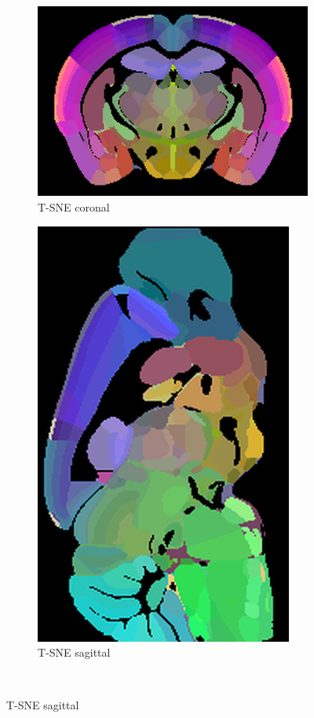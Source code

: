\documentclass[]{article}
\begin{document}
\begin{figure}
	\begin{subfigure}{.43\textwidth}
		\centering
		\includegraphics[width=.9\linewidth]{../results/tsne_ano_coronal_50_res_slice_1.png}
		\caption{T-SNE coronal}
		\label{fig:TSNE_cor}
	\end{subfigure}
	\begin{subfigure}{.3\textwidth}
		\centering
		\includegraphics[width=.9\linewidth, angle=270]{../results/tsne_ano_sagittal_50_res_slice_1.png}
		\caption{T-SNE sagittal}
		\label{fig:TSNE_sag}
	\end{subfigure}\\


\end{figure}
\end{document}
